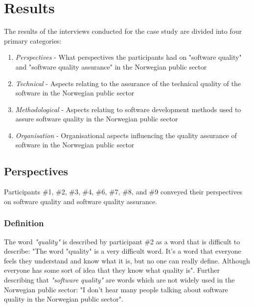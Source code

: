 \chapter{Results} \label{sec:results}
The results of the interviews conducted for the case study are divided into four primary categories:

\begin{enumerate}
    \item \textit{Perspectives} - What perspectives the participants had on "software quality" and "software quality assurance" in the Norwegian public sector
    \item \textit{Technical} - Aspects relating to the assurance of the technical quality of the software in the Norwegian public sector 
    \item \textit{Methodological} - Aspects relating to software development methods used to assure software quality in the Norwegian public sector
    \item \textit{Organisation} - Organisational aspects influencing the quality assurance of software in the Norwegian public sector
\end{enumerate}

\section{Perspectives} \label{sec:perspectives}
Participants \#1, \#2, \#3, \#4, \#6, \#7, \#8, and \#9 conveyed their perspectives on software quality and software quality assurance.

\subsection{Definition} \label{sec:definition}
The word \textit{"quality"} is described by participant \#2 as a word that is difficult to describe: "The word "quality" is a very difficult word. It's a word that everyone feels they understand and know what it is, but no one can really define. Although everyone has some sort of idea that they know what quality is". Further describing that \textit{"software quality"} are words which are not widely used in the Norwegian public sector: "I don't hear many people talking about software quality in the Norwegian public sector".


